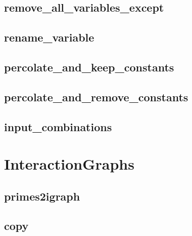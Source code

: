 \documentclass[letterpaper,10pt,english]{sphinxmanual}
\begin{document}
\subsection{remove\_all\_variables\_except}
\label{\detokenize{PrimeImplicants:id12}}\label{\detokenize{PrimeImplicants:remove-all-variables-except}}

\subsection{rename\_variable}
\label{\detokenize{PrimeImplicants:rename-variable}}\label{\detokenize{PrimeImplicants:id13}}

\subsection{percolate\_and\_keep\_constants}
\label{\detokenize{PrimeImplicants:percolate-and-keep-constants}}\label{\detokenize{PrimeImplicants:id14}}

\subsection{percolate\_and\_remove\_constants}
\label{\detokenize{PrimeImplicants:percolate-and-remove-constants}}\label{\detokenize{PrimeImplicants:id15}}

\subsection{input\_combinations}
\label{\detokenize{PrimeImplicants:input-combinations}}\label{\detokenize{PrimeImplicants:id16}}

\section{InteractionGraphs}
\label{\detokenize{InteractionGraphs::doc}}\label{\detokenize{InteractionGraphs:interactiongraphs}}\label{\detokenize{InteractionGraphs:id1}}

\subsection{primes2igraph}
\label{\detokenize{InteractionGraphs:id2}}\label{\detokenize{InteractionGraphs:primes2igraph}}

\subsection{copy}
\label{\detokenize{InteractionGraphs:igraph-copy}}\label{\detokenize{InteractionGraphs:copy}}
\end{document}
